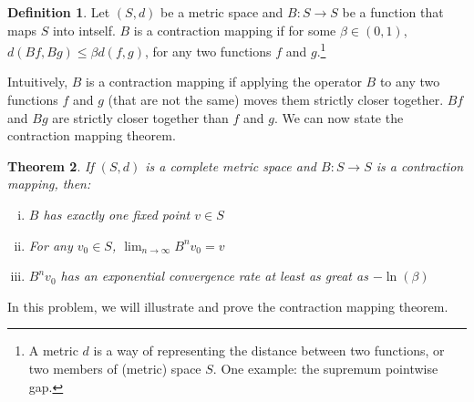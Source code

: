 \documentclass[11pt]{extarticle}
\theoremstyle{plain}
\newtheorem{thm}{Theorem}
\theoremstyle{definition}
\newtheorem{defn}[thm]{Definition}
\begin{document}
\vspace{5mm}
\begin{defn}
	
	Let $(S, d)$ be a metric space and $B: S \to S$ be a function that maps $S$ into intself. $B$ is a contraction mapping if for some $\beta \in (0, 1)$, $d(Bf, Bg) \leq \beta d(f, g)$, for any two functions $f$ and $g$.\footnote{
		A metric $d$ is a way of representing the distance between two functions, or two members of (metric) space $S$. One example: the supremum pointwise gap.
	}
	
\end{defn}


\vspace{5mm}
\noindent
Intuitively, $B$ is a contraction mapping if applying the operator $B$ to any two functions $f$ and $g$ (that are not the same) moves them strictly closer together. $Bf$ and $Bg$ are strictly closer together than $f$ and $g$. We can now state the contraction mapping theorem. 


\vspace{5mm}
\begin{thm}
	

	If $(S, d)$ is a complete metric space and $B: S \to S$ is a contraction mapping, then: 
	\begin{enumerate}[(i)]
		\item $B$ has exactly one fixed point $v \in S$
		\item For any $v_0 \in S$, $\lim_{n \to \infty} B^n v_0 = v$
		\item $B^n v_0$ has an exponential convergence rate at least as great as $- \ln(\beta)$
	\end{enumerate}
	
\end{thm}


\vspace{10mm}
\noindent
In this problem, we will illustrate and prove the contraction mapping theorem.
\end{document}
